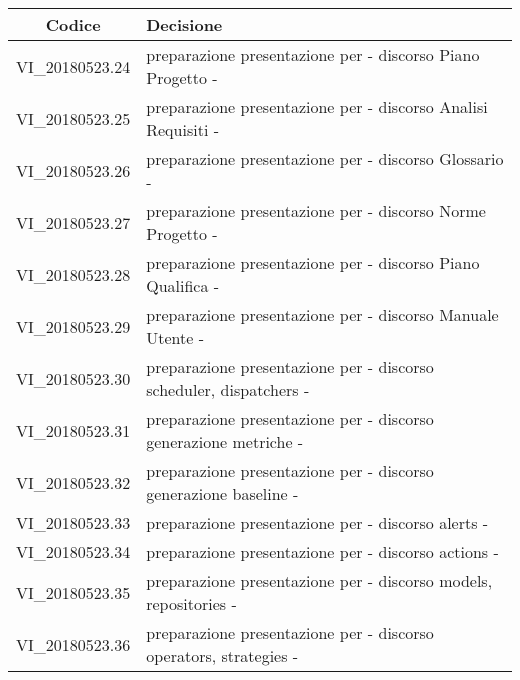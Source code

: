 \begin{center}
    \begin{tabular}{c | p{11cm}}
    \centering
        \rowcolor[gray]{.9} { \textbf{Codice} } & { \textbf{Decisione} } \\ 
        \hline
        \rowcolor[gray]{.9} VI\_20180523.24 & preparazione presentazione per \Proponente{} - discorso Piano Progetto - \Tommaso{} \\
        \rowcolor[gray]{.8} VI\_20180523.25 & preparazione presentazione per \Proponente{} - discorso Analisi Requisiti - \Mattia{} \\
        \rowcolor[gray]{.9} VI\_20180523.26 & preparazione presentazione per \Proponente{} - discorso Glossario - \Isacco{} \\
        \rowcolor[gray]{.8} VI\_20180523.27 & preparazione presentazione per \Proponente{} - discorso Norme Progetto - \Cristian{} \\
        \rowcolor[gray]{.9} VI\_20180523.28 & preparazione presentazione per \Proponente{} - discorso Piano Qualifica - \Luca{} \\
        \rowcolor[gray]{.8} VI\_20180523.29 & preparazione presentazione per \Proponente{} - discorso Manuale Utente - \Carlo{} \\
        \rowcolor[gray]{.9} VI\_20180523.30 & preparazione presentazione per \Proponente{} - discorso scheduler, dispatchers - \Leonardo{} \\
        \rowcolor[gray]{.8} VI\_20180523.31 & preparazione presentazione per \Proponente{} - discorso generazione metriche - \Tommaso{} \\
        \rowcolor[gray]{.9} VI\_20180523.32 & preparazione presentazione per \Proponente{} - discorso generazione baseline - \Mattia{} \\
        \rowcolor[gray]{.8} VI\_20180523.33 & preparazione presentazione per \Proponente{} - discorso alerts - \Isacco{} \\
        \rowcolor[gray]{.9} VI\_20180523.34 & preparazione presentazione per \Proponente{} - discorso actions - \Cristian{} \\
        \rowcolor[gray]{.8} VI\_20180523.35 & preparazione presentazione per \Proponente{} - discorso models, repositories - \Luca{} \\
        \rowcolor[gray]{.9} VI\_20180523.36 & preparazione presentazione per \Proponente{} - discorso operators, strategies - \Carlo{} \\
    \end{tabular}
\end{center}
